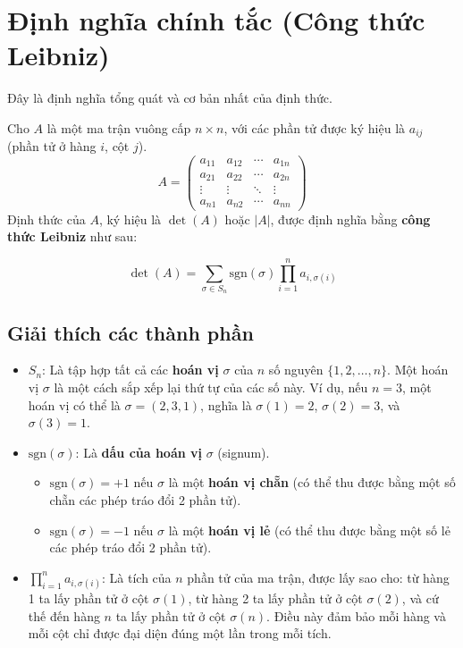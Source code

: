 \section{Định nghĩa chính tắc (Công thức Leibniz)}

Đây là định nghĩa tổng quát và cơ bản nhất của định thức.

Cho $A$ là một ma trận vuông cấp $n \times n$, với các phần tử được ký hiệu là $a_{ij}$ (phần tử ở hàng $i$, cột $j$).
$$ A = \begin{pmatrix}
a_{11} & a_{12} & \cdots & a_{1n} \\
a_{21} & a_{22} & \cdots & a_{2n} \\
\vdots & \vdots & \ddots & \vdots \\
a_{n1} & a_{n2} & \cdots & a_{nn}
\end{pmatrix} $$
Định thức của $A$, ký hiệu là $\det(A)$ hoặc $|A|$, được định nghĩa bằng \textbf{công thức Leibniz} như sau:

$$ \det(A) = \sum_{\sigma \in S_n} \text{sgn}(\sigma) \prod_{i=1}^{n} a_{i, \sigma(i)} $$

\subsection*{Giải thích các thành phần}
\begin{itemize}
    \item \textbf{$S_n$}: Là tập hợp tất cả các \textbf{hoán vị} $\sigma$ của $n$ số nguyên $\{1, 2, \dots, n\}$. Một hoán vị $\sigma$ là một cách sắp xếp lại thứ tự của các số này. Ví dụ, nếu $n=3$, một hoán vị có thể là $\sigma = (2, 3, 1)$, nghĩa là $\sigma(1)=2$, $\sigma(2)=3$, và $\sigma(3)=1$.
    
    \item \textbf{$\text{sgn}(\sigma)$}: Là \textbf{dấu của hoán vị} $\sigma$ (signum).
    \begin{itemize}
        \item $\text{sgn}(\sigma) = +1$ nếu $\sigma$ là một \textbf{hoán vị chẵn} (có thể thu được bằng một số chẵn các phép tráo đổi 2 phần tử).
        \item $\text{sgn}(\sigma) = -1$ nếu $\sigma$ là một \textbf{hoán vị lẻ} (có thể thu được bằng một số lẻ các phép tráo đổi 2 phần tử).
    \end{itemize}
    
    \item \textbf{$\prod_{i=1}^{n} a_{i, \sigma(i)}$}: Là tích của $n$ phần tử của ma trận, được lấy sao cho: từ hàng 1 ta lấy phần tử ở cột $\sigma(1)$, từ hàng 2 ta lấy phần tử ở cột $\sigma(2)$, và cứ thế đến hàng $n$ ta lấy phần tử ở cột $\sigma(n)$. Điều này đảm bảo mỗi hàng và mỗi cột chỉ được đại diện đúng một lần trong mỗi tích.
\end{itemize}

